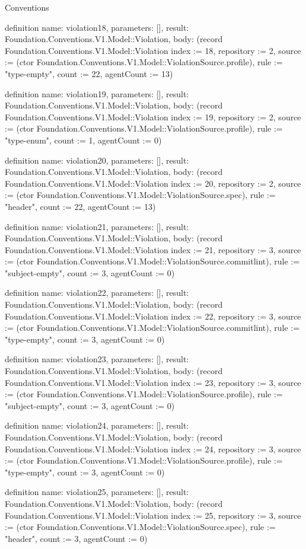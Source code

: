\begin{lexlean}{Conventions}
\begin{semanticmodule}
definition{
  name: violation18,
  parameters: [],
  result: Foundation.Conventions.V1.Model::Violation,
  body: (record Foundation.Conventions.V1.Model::Violation {index := 18, repository := 2, source := (ctor Foundation.Conventions.V1.Model::ViolationSource.profile), rule := "type-empty", count := 22, agentCount := 13})
}

definition{
  name: violation19,
  parameters: [],
  result: Foundation.Conventions.V1.Model::Violation,
  body: (record Foundation.Conventions.V1.Model::Violation {index := 19, repository := 2, source := (ctor Foundation.Conventions.V1.Model::ViolationSource.profile), rule := "type-enum", count := 1, agentCount := 0})
}

definition{
  name: violation20,
  parameters: [],
  result: Foundation.Conventions.V1.Model::Violation,
  body: (record Foundation.Conventions.V1.Model::Violation {index := 20, repository := 2, source := (ctor Foundation.Conventions.V1.Model::ViolationSource.spec), rule := "header", count := 22, agentCount := 13})
}

definition{
  name: violation21,
  parameters: [],
  result: Foundation.Conventions.V1.Model::Violation,
  body: (record Foundation.Conventions.V1.Model::Violation {index := 21, repository := 3, source := (ctor Foundation.Conventions.V1.Model::ViolationSource.commitlint), rule := "subject-empty", count := 3, agentCount := 0})
}

definition{
  name: violation22,
  parameters: [],
  result: Foundation.Conventions.V1.Model::Violation,
  body: (record Foundation.Conventions.V1.Model::Violation {index := 22, repository := 3, source := (ctor Foundation.Conventions.V1.Model::ViolationSource.commitlint), rule := "type-empty", count := 3, agentCount := 0})
}

definition{
  name: violation23,
  parameters: [],
  result: Foundation.Conventions.V1.Model::Violation,
  body: (record Foundation.Conventions.V1.Model::Violation {index := 23, repository := 3, source := (ctor Foundation.Conventions.V1.Model::ViolationSource.profile), rule := "subject-empty", count := 3, agentCount := 0})
}

definition{
  name: violation24,
  parameters: [],
  result: Foundation.Conventions.V1.Model::Violation,
  body: (record Foundation.Conventions.V1.Model::Violation {index := 24, repository := 3, source := (ctor Foundation.Conventions.V1.Model::ViolationSource.profile), rule := "type-empty", count := 3, agentCount := 0})
}

definition{
  name: violation25,
  parameters: [],
  result: Foundation.Conventions.V1.Model::Violation,
  body: (record Foundation.Conventions.V1.Model::Violation {index := 25, repository := 3, source := (ctor Foundation.Conventions.V1.Model::ViolationSource.spec), rule := "header", count := 3, agentCount := 0})
}


\end{semanticmodule}
\end{lexlean}
